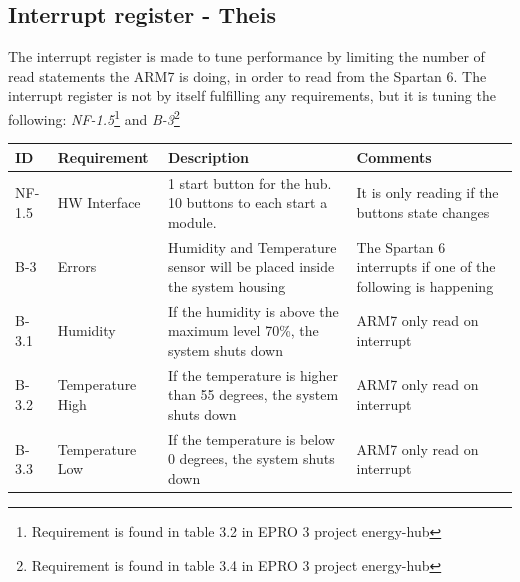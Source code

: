 \subsection{Interrupt register - Theis}
The interrupt register is made to tune performance by limiting the number of read statements the ARM7 is doing, in order to read from the Spartan 6. The interrupt register is not by itself fulfilling any requirements, but it is tuning the following: \textit{NF-1.5}\footnote{Requirement is found in table 3.2 in EPRO 3 project energy-hub} and \textit{B-3}\footnote{Requirement is found in table 3.4 in EPRO 3 project energy-hub}
\begin{table}[H]
\centering
	\begin{tabular}{|p{1.2cm}|p{2.3cm}|p{6cm}|p{6cm}|}
	\hline
	ID		& Requirement		& Description																& Comments\\\hline
	NF-1.5	& HW Interface		& 1 start button for the hub. 10 buttons to each start a module.			& It is only reading if the buttons state changes\\\hline
	B-3		& Errors			& Humidity and Temperature sensor will be placed inside the system housing	& The Spartan 6 interrupts if one of the following is happening\\\hline
	B-3.1	& Humidity			& If the humidity is above the maximum level 70\%, the system shuts down	& ARM7 only read on interrupt\\\hline
	B-3.2	& Temperature High	& If the temperature is higher than 55 degrees, the system shuts down		& ARM7 only read on interrupt\\\hline
	B-3.3	& Temperature Low	& If the temperature is below 0 degrees, the system shuts down				& ARM7 only read on interrupt\\\hline
	\end{tabular}
\end{table}
